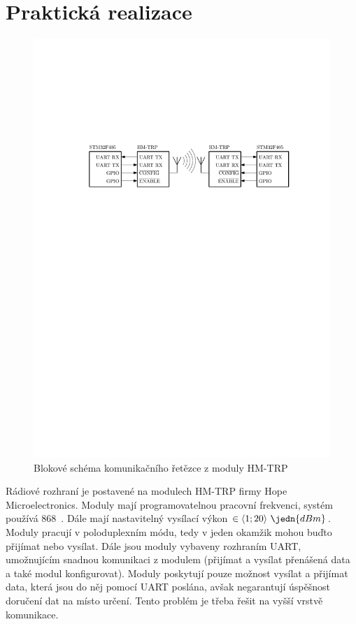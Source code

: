 \section{Praktická realizace}
\begin{figure}[H]
    \begin{center}
        \includegraphics[width=\textwidth]{img/hm-trp}
    \end{center}
    \caption{Blokové schéma komunikačního řetězce z moduly HM-TRP}
\end{figure}
Rádiové rozhraní je postavené na modulech HM-TRP firmy Hope Microelectronics. Moduly mají programovatelnou pracovní frekvenci, systém používá 868~. Dále mají nastavitelný vysílací výkon $\in \langle 1; 20 \rangle~\jedn{dBm}$. Moduly pracují v poloduplexním módu, tedy v jeden okamžik mohou buďto přijímat nebo vysílat. Dále jsou moduly vybaveny rozhraním UART, umožnujícím snadnou komunikaci z modulem (přijímat a vysílat přenášená data a také modul konfigurovat). Moduly poskytují pouze možnost vysílat a přijímat data, která jsou do něj pomocí UART poslána, avšak negarantují úspěšnost doručení dat na místo určení. Tento problém je třeba řešit na vyšší vrstvě komunikace.
